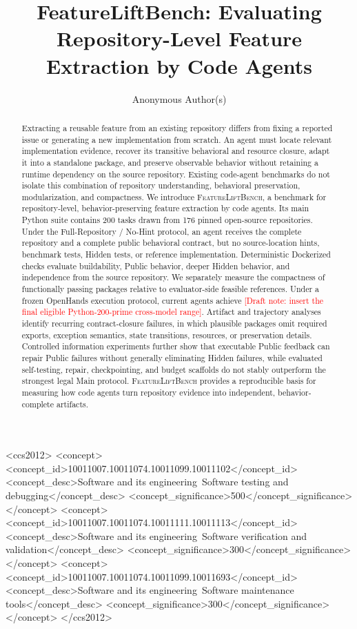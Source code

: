 \documentclass[acmsmall,anonymous,review,screen]{acmart}
\newcommand{\flb}{\textsc{FeatureLiftBench}\xspace}
\newcommand{\draftnote}[1]{\textcolor{red}{[Draft note: #1]}}
\begin{document}
\title{FeatureLiftBench: Evaluating Repository-Level Feature Extraction by Code Agents}

\author{Anonymous Author(s)}
\renewcommand{\shortauthors}{Anonymous Author(s)}

\begin{abstract}
Extracting a reusable feature from an existing repository differs from fixing
a reported issue or generating a new implementation from scratch. An agent
must locate relevant implementation evidence, recover its transitive behavioral
and resource closure, adapt it into a standalone package, and preserve
observable behavior without retaining a runtime dependency on the source
repository. Existing code-agent benchmarks do not isolate this combination of
repository understanding, behavioral preservation, modularization, and
compactness. We introduce \flb, a benchmark for repository-level,
behavior-preserving feature extraction by code agents. Its main Python suite
contains 200 tasks drawn from 176 pinned open-source repositories. Under the
Full-Repository / No-Hint protocol, an agent receives the complete repository
and a complete public behavioral contract, but no source-location hints,
benchmark tests, Hidden tests, or reference implementation. Deterministic
Dockerized checks evaluate buildability, Public behavior, deeper Hidden
behavior, and independence from the source repository. We separately measure
the compactness of functionally passing packages relative to evaluator-side
feasible references. Under a frozen OpenHands execution protocol, current
agents achieve \draftnote{insert the final eligible Python-200-prime
cross-model range}. Artifact and trajectory analyses identify recurring
contract-closure failures, in which plausible packages omit required exports,
exception semantics, state transitions, resources, or preservation details.
Controlled information experiments further show that executable Public
feedback can repair Public failures without generally eliminating Hidden
failures, while evaluated self-testing, repair, checkpointing, and budget
scaffolds do not stably outperform the strongest legal Main protocol. \flb
provides a reproducible basis for measuring how code agents turn repository
evidence into independent, behavior-complete artifacts.
\end{abstract}

\begin{CCSXML}
<ccs2012>
 <concept>
  <concept_id>10011007.10011074.10011099.10011102</concept_id>
  <concept_desc>Software and its engineering~Software testing and debugging</concept_desc>
  <concept_significance>500</concept_significance>
 </concept>
 <concept>
  <concept_id>10011007.10011074.10011111.10011113</concept_id>
  <concept_desc>Software and its engineering~Software verification and validation</concept_desc>
  <concept_significance>300</concept_significance>
 </concept>
 <concept>
  <concept_id>10011007.10011074.10011099.10011693</concept_id>
  <concept_desc>Software and its engineering~Software maintenance tools</concept_desc>
  <concept_significance>300</concept_significance>
 </concept>
</ccs2012>
\end{CCSXML}
\end{document}
